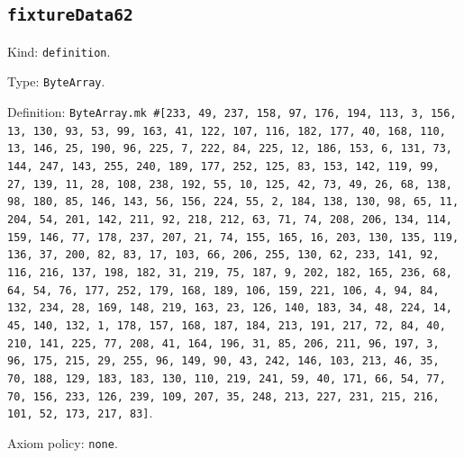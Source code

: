 \documentclass[11pt]{article}
\begin{document}
\subsection*{\texttt{fixtureData62}}
\noindent Kind: \texttt{definition}.\par
\noindent Type: \texttt{ByteArray}.\par
\noindent Definition: \texttt{ByteArray.mk \#[233, 49, 237, 158, 97, 176, 194, 113, 3, 156, 13, 130, 93, 53, 99, 163, 41, 122, 107, 116, 182, 177, 40, 168, 110, 13, 146, 25, 190, 96, 225, 7, 222, 84, 225, 12, 186, 153, 6, 131, 73, 144, 247, 143, 255, 240, 189, 177, 252, 125, 83, 153, 142, 119, 99, 27, 139, 11, 28, 108, 238, 192, 55, 10, 125, 42, 73, 49, 26, 68, 138, 98, 180, 85, 146, 143, 56, 156, 224, 55, 2, 184, 138, 130, 98, 65, 11, 204, 54, 201, 142, 211, 92, 218, 212, 63, 71, 74, 208, 206, 134, 114, 159, 146, 77, 178, 237, 207, 21, 74, 155, 165, 16, 203, 130, 135, 119, 136, 37, 200, 82, 83, 17, 103, 66, 206, 255, 130, 62, 233, 141, 92, 116, 216, 137, 198, 182, 31, 219, 75, 187, 9, 202, 182, 165, 236, 68, 64, 54, 76, 177, 252, 179, 168, 189, 106, 159, 221, 106, 4, 94, 84, 132, 234, 28, 169, 148, 219, 163, 23, 126, 140, 183, 34, 48, 224, 14, 45, 140, 132, 1, 178, 157, 168, 187, 184, 213, 191, 217, 72, 84, 40, 210, 141, 225, 77, 208, 41, 164, 196, 31, 85, 206, 211, 96, 197, 3, 96, 175, 215, 29, 255, 96, 149, 90, 43, 242, 146, 103, 213, 46, 35, 70, 188, 129, 183, 183, 130, 110, 219, 241, 59, 40, 171, 66, 54, 77, 70, 156, 233, 126, 239, 109, 207, 35, 248, 213, 227, 231, 215, 216, 101, 52, 173, 217, 83]}.\par
\noindent Axiom policy: \texttt{none}.\par
\end{document}
